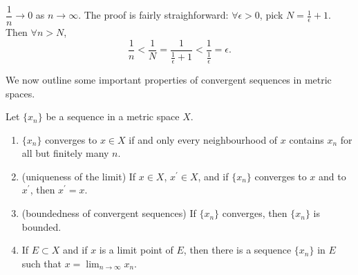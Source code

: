 \begin{example}
$\dfrac{1}{n}\to 0$ as $n\to\infty$. The proof is fairly straighforward: $\forall\epsilon>0$, pick $N=\frac{1}{\epsilon}+1$. Then $\forall n>N$,
\[ \frac{1}{n}<\frac{1}{N}=\frac{1}{\frac{1}{\epsilon}+1}<\frac{1}{\frac{1}{\epsilon}}=\epsilon. \]
\end{example}

We now outline some important properties of convergent sequences in metric spaces.

\begin{proposition}
Let $\{x_n\}$ be a sequence in a metric space $X$.
\begin{enumerate}[label=(\arabic*)]
\item $\{x_n\}$ converges to $x\in X$ if and only every neighbourhood of $x$ contains $x_n$ for all but finitely many $n$.
\item (uniqueness of the limit) If $x\in X$, $x^\prime\in X$, and if $\{x_n\}$ converges to $x$ and to $x^\prime$, then $x^\prime=x$.
\item (boundedness of convergent sequences) If $\{x_n\}$ converges, then $\{x_n\}$ is bounded.
\item If $E\subset X$ and if $x$ is a limit point of $E$, then there is a sequence $\{x_n\}$ in $E$ such that $\displaystyle x=\lim_{n\to\infty}x_n$.
\end{enumerate}
\end{proposition}

